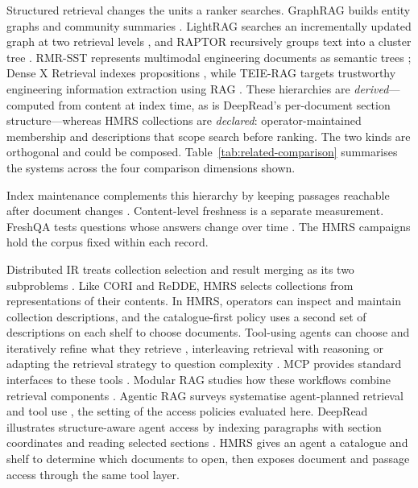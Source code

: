 Structured retrieval changes the units a ranker searches.
GraphRAG builds entity graphs and community
summaries \citep{graphrag}. LightRAG searches an incrementally updated
graph at two retrieval levels \citep{lightrag}, and RAPTOR recursively
groups text into a cluster tree \citep{raptor}. RMR-SST represents multimodal engineering
documents as semantic trees \citep{li-kbs-rmrsst-2026}; Dense X Retrieval
indexes propositions \citep{chen2024dense}, while TEIE-RAG targets
trustworthy engineering information extraction using RAG
\citep{shen-kbs-teierag-2026}.
These hierarchies are \emph{derived}---computed from content at index
time, as is DeepRead's per-document section structure---whereas HMRS
collections are \emph{declared}: operator-maintained membership and
descriptions that scope search before ranking. The two kinds are
orthogonal and could be composed.
Table~\ref{tab:related-comparison} summarises the systems across the four
comparison dimensions shown.

Index maintenance complements this hierarchy by keeping passages reachable
after document changes \citep{xu2023spfresh}. Content-level freshness is a
separate measurement. FreshQA tests questions whose answers change over
time \citep{vu-freshqa-2024}. The HMRS campaigns hold the corpus fixed
within each record.

Distributed IR treats collection selection and result merging as its two
subproblems \citep{callan1995searching,si2003redde,shokouhi-federated-2011}.
Like CORI and ReDDE, HMRS selects collections from representations of
their contents. In HMRS, operators can inspect and maintain collection
descriptions, and the catalogue-first policy uses a second set of
descriptions on each shelf to choose documents. Tool-using agents can
choose and iteratively refine what they retrieve
\citep{react-yao,toolformer}, interleaving retrieval with reasoning
\citep{ircot} or adapting the retrieval strategy to question complexity
\citep{adaptive-rag}. MCP provides standard
interfaces to these tools \citep{mcp}. Modular RAG studies how these
workflows combine retrieval components \citep{modular-rag}. Agentic RAG
surveys systematise agent-planned retrieval and tool use
\citep{singh-agentic-rag-2025}, the setting of the access policies evaluated
here. DeepRead illustrates structure-aware agent access by indexing paragraphs with section
coordinates and reading selected sections \citep{deepread}. HMRS gives
an agent a catalogue and shelf to determine which documents to open, then
exposes document and passage access through the same tool layer.

